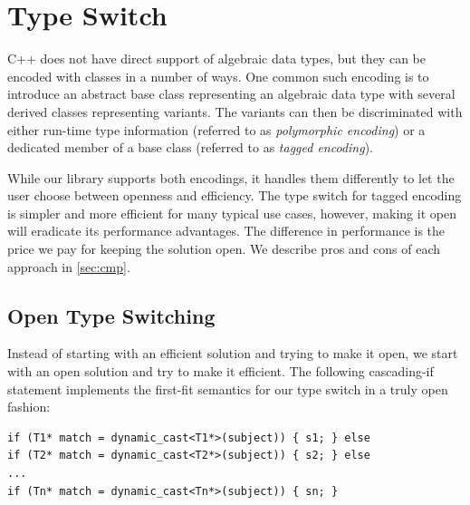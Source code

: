 \section{Type Switch}
\label{sec:copc}

C++ does not have direct support of algebraic data types, but they can be 
encoded with classes in a number of ways. One common such encoding is to 
introduce an abstract base class representing an algebraic data type with 
several derived classes representing variants. The variants can then be 
discriminated with either run-time type information (referred to as 
\emph{polymorphic encoding}) or a dedicated member of a base class 
(referred to  as \emph{tagged encoding}).

While our library supports both encodings, it handles them differently to let 
the user choose between openness and efficiency. The type switch for tagged 
encoding is simpler and more efficient for many typical use cases, however, 
making it open will eradicate its performance advantages. The difference in 
performance is the price we pay for keeping the solution open. We describe pros 
and cons of each approach in \textsection\ref{sec:cmp}.




\subsection{Open Type Switching}
\label{sec:poets}

Instead of starting with an efficient solution and trying to make it open, we 
start with an open solution and try to make it efficient. The following 
cascading-if statement implements the first-fit semantics for our type switch in 
a truly open fashion:

\begin{lstlisting}
if (T1* match = dynamic_cast<T1*>(subject)) { s1; } else
if (T2* match = dynamic_cast<T2*>(subject)) { s2; } else
...
if (Tn* match = dynamic_cast<Tn*>(subject)) { sn; }
\end{lstlisting}

